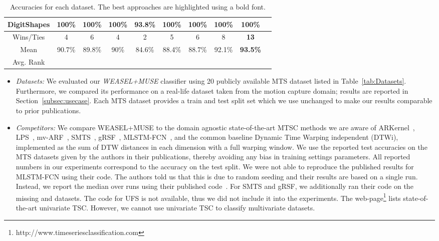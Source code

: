 \documentclass[sigconf]{acmart}
\begin{document}
\begin{table*}[t]
\begin{centering}
\begin{tabular*}{2\columnwidth}{@{\extracolsep{\fill}}cccccccccc}
			\hline 
			DigitShapes & \textbf{100\%} & \textbf{100\%} & \textbf{100\%} & \textbf{93.8\%} & \textbf{100\%} & \textbf{100\%} & \textbf{100\%} & \textbf{100\%}\tabularnewline
			\hline
			\hline 
			Wins/Ties & 4 & 6 & 4 & 2 & 5 & 6 & 8 & \textbf{13}\tabularnewline
			\hline 
			Mean & 90.7\% & 89.8\% & 90\% & 84.6\% & 88.4\% & 88.7\% & 92.1\% & \textbf{93.5\%}\tabularnewline
			\hline 
			Avg. Rank &  &  &  &  &  &  &  &  \tabularnewline 
		\end{tabular*}
		\par\end{centering}	
	\caption{Accuracies for each dataset. The best approaches are highlighted using a bold font.\label{tab:accuracies}}
\end{table*}

\begin{itemize}
	\item \emph{Datasets:} We evaluated our \emph{WEASEL+MUSE} classifier using 20 publicly available MTS dataset listed in Table~\ref{tab:Datasets}. Furthermore, we compared its performance on a real-life dataset taken from the motion capture domain; results are reported in Section~\ref{subsec:usecase}. Each MTS dataset provides a train and test split set which we use unchanged to make our results comparable to prior publications. 
	\item \emph{Competitors:} We compare WEASEL+MUSE to the  domain agnostic state-of-the-art MTSC methods we are aware of ARKernel~\cite{cuturi2011autoregressive}, LPS~\cite{baydogan2016time}, mv-ARF~\cite{tuncel2018autoregressive}, SMTS~\cite{baydogan2015learning}, gRSF~\cite{karlsson2016generalized}, MLSTM-FCN~\cite{karim2018multivariate}, and the common baseline Dynamic Time Warping independent (DTWi), implemented as the sum of DTW distances in each dimension with a full warping window. We use the reported test accuracies on the MTS datasets given by the authors in their publications, thereby avoiding any bias in training settings parameters. All reported numbers in our experiments correspond to the accuracy on the test split. 
	We were not able to reproduce the published results for MLSTM-FCN using their code. The authors told us that this is due to random seeding and their results are based on a single run. Instead, we report the median over  runs using their published code~\cite{karim2018multivariate}.	
	For SMTS and gRSF, we additionally ran their code on the missing  and  datasets. The code for UFS is not available, thus we did not include it into the experiments.
	The web-page\footnote{http://www.timeseriesclassification.com} lists state-of-the-art univariate TSC. However, we cannot use univariate TSC to classify multivariate datasets.

\end{itemize}
\end{document}
